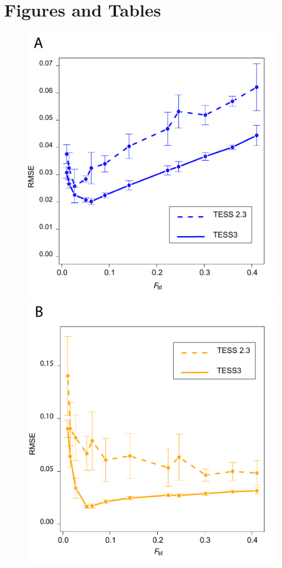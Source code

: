 
\section{Figures and Tables}

\begin{figure}[h!]\centering
\begin{minipage}{0.49\textwidth}
\includegraphics[width=\linewidth]{FinalGraphs/rmseG.pdf}
\end{minipage}
\begin {minipage}{0.49\textwidth}
\includegraphics[width=\linewidth]{FinalGraphs/rmseQ.pdf}

\end{minipage}
\end{figure}
